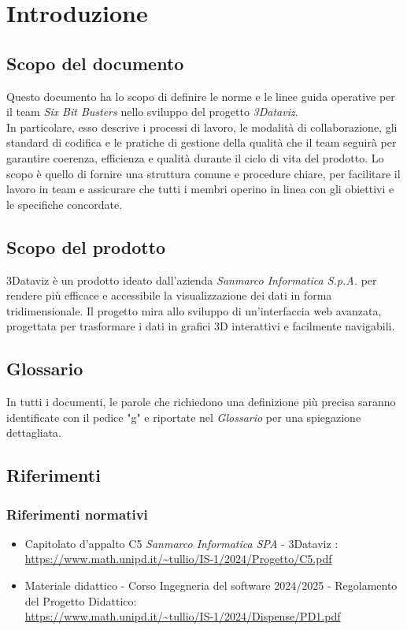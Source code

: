 \section{Introduzione}
    \subsection{Scopo del documento}
        Questo documento ha lo scopo di definire le norme e le linee guida operative
        per il team \textit{Six Bit Busters} nello sviluppo del progetto
        \textit{3Dataviz}.\\ In particolare, esso descrive i processi di lavoro,
        le modalità di collaborazione, gli standard di codifica e le pratiche
        di gestione della qualità che il team seguirà per garantire coerenza, 
        efficienza e qualità durante il ciclo di vita del prodotto. 
        Lo scopo è quello di fornire una struttura comune e procedure chiare, per 
        facilitare il lavoro in team e assicurare che tutti i membri operino in 
        linea con gli obiettivi e le specifiche concordate.

    \subsection{Scopo del prodotto}

   3Dataviz è un prodotto ideato dall'azienda \textit{Sanmarco Informatica S.p.A.} per rendere più efficace e accessibile la visualizzazione dei dati in forma tridimensionale. Il progetto mira allo sviluppo di un’interfaccia web avanzata, progettata per trasformare i dati in grafici 3D interattivi e facilmente navigabili.
        
    \subsection{Glossario}
      In tutti i documenti, le parole che richiedono una definizione più precisa saranno identificate con il pedice "g" e riportate nel \textit{Glossario} per una spiegazione dettagliata.
        
    \subsection{Riferimenti}
        \subsubsection{Riferimenti normativi}
        \begin{itemize}
            \item Capitolato d'appalto C5 \textit{Sanmarco Informatica SPA} - 3Dataviz : \\ \url{https://www.math.unipd.it/~tullio/IS-1/2024/Progetto/C5.pdf}
            \item Materiale didattico - Corso Ingegneria del software 2024/2025 - Regolamento del Progetto Didattico: \\ \url{https://www.math.unipd.it/~tullio/IS-1/2024/Dispense/PD1.pdf}
        \end{itemize}
